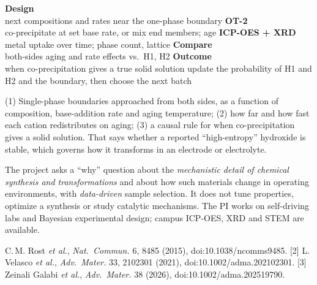 \documentclass[11pt,letterpaper]{article}
\begin{document}
\wpflow
  {\textbf{Design}\\ next compositions and rates near the one-phase boundary}
  {\textbf{OT-2}\\ co-precipitate at set base rate, or mix end members; age}
  {\textbf{ICP-OES + XRD}\\ metal uptake over time; phase count, lattice}
  {\textbf{Compare}\\ both-sides aging and rate effects vs.\ H1, H2}
  {\textbf{Outcome}\\ when co-precipitation gives a true solid solution}
  {update the probability of H1 and H2 and the boundary, then choose the next batch}

 (1) Single-phase boundaries approached from both sides, as a function of
composition, base-addition rate and aging temperature; (2) how far and how fast each cation
redistributes on aging; (3) a causal rule for when co-precipitation gives a solid solution. That
says whether a reported ``high-entropy'' hydroxide is stable, which governs how it transforms in an
electrode or electrolyte.

 The project asks a ``why'' question about the \emph{mechanistic detail of
chemical synthesis and transformations} and about how such materials change in operating
environments, with \emph{data-driven} sample selection. It
does not tune properties, optimize a synthesis or study catalytic mechanisms. The PI works on
self-driving labs and Bayesian experimental design; campus ICP-OES, XRD and STEM are available.

\begin{wprefs}
[1] C.\,M. Rost \emph{et al.}, \emph{Nat.\ Commun.} 6, 8485 (2015), doi:10.1038/ncomms9485.
[2] L. Velasco \emph{et al.}, \emph{Adv.\ Mater.} 33, 2102301 (2021), doi:10.1002/adma.202102301.
[3] Zeinali Galabi \emph{et al.}, \emph{Adv.\ Mater.} 38 (2026), doi:10.1002/adma.202519790.
\end{wprefs}
\end{document}

